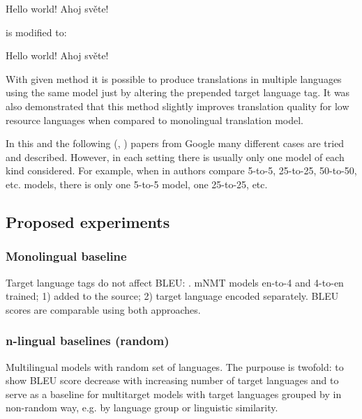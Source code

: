 \begin{displayquote}
Hello world! \to{} Ahoj světe!
\end{displayquote}
is modified to:

\begin{displayquote}
 Hello world! \to{} Ahoj světe!
\end{displayquote}

With given method it is possible to produce translations in multiple languages using the
same model just by altering the prepended target language tag.
It was also demonstrated that this method slightly improves translation quality for 
low resource languages when compared to monolingual translation model.

In this and the following
(, )
papers from Google many different cases are tried and described.
However, in each setting there is usually only one model of each kind considered.
For example, when in  authors compare 5-to-5,
25-to-25, 50-to-50, etc. models, there is only one 5-to-5 model, one 25-to-25, etc.


\subsection{Proposed experiments}
\label{subsection:proposed_experiments}


\subsubsection*{Monolingual baseline}

Target language tags do not affect BLEU: .
mNMT models en-to-4 and 4-to-en trained;
 1)  added to the source;
 2) target language encoded separately.
BLEU scores are comparable using both approaches.

\subsubsection*{n-lingual baselines (random)}

Multilingual models with random set of languages.
The purpouse is twofold: 
to show BLEU score decrease with increasing number of target languages and
to serve as a baseline for multitarget models with target languages grouped by
in non-random way, e.g. by language group or linguistic similarity.


